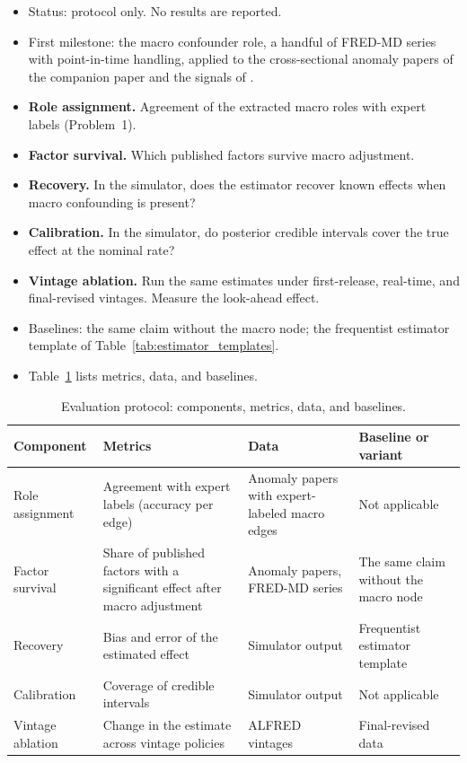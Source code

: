   \begin{itemize}
  \tightlist
  \item
    Status: protocol only. No results are reported.
  \item
    First milestone: the macro confounder role, a handful of FRED-MD series
    with point-in-time handling, applied to the cross-sectional anomaly
    papers of the companion paper \cite{adia2026finance} and the signals of
    \cite{chen2022open}.
  \item
    \textbf{Role assignment.} Agreement of the extracted macro roles with
    expert labels (Problem~1).
  \item
    \textbf{Factor survival.} Which published factors survive macro
    adjustment.
  \item
    \textbf{Recovery.} In the simulator, does the estimator recover known
    effects when macro confounding is present?
  \item
    \textbf{Calibration.} In the simulator, do posterior credible intervals
    cover the true effect at the nominal rate?
  \item
    \textbf{Vintage ablation.} Run the same estimates under first-release,
    real-time, and final-revised vintages. Measure the look-ahead effect.
  \item
    Baselines: the same claim without the macro node; the frequentist
    estimator template of Table~\ref{tab:estimator_templates}.
  \item
    Table~\ref{tab:evaluation} lists metrics, data, and baselines.
  \end{itemize}

  \begin{table}[H]
    \centering
    \begin{tabularx}{\linewidth}{lXXX}
      \toprule
      Component & Metrics & Data & Baseline or variant \\
      \midrule
      Role assignment & Agreement with expert labels (accuracy per edge) &
      Anomaly papers with expert-labeled macro edges & Not applicable \\
      Factor survival & Share of published factors with a significant effect
      after macro adjustment & Anomaly papers, FRED-MD series & The same claim
      without the macro node \\
      Recovery & Bias and error of the estimated effect & Simulator output &
      Frequentist estimator template \\
      Calibration & Coverage of credible intervals & Simulator output & Not
      applicable \\
      Vintage ablation & Change in the estimate across vintage policies &
      ALFRED vintages & Final-revised data \\
      \bottomrule
    \end{tabularx}
    \caption{Evaluation protocol: components, metrics, data, and baselines.}
    \label{tab:evaluation}
  \end{table}

